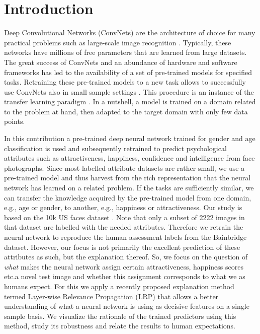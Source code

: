 \documentclass[runningheads]{llncs}
\begin{document}
\section{Introduction}
Deep Convolutional Networks (ConvNets) \cite{le1990handwritten} are the architecture of choice for many practical problems such as large-scale image recognition \cite{krizhevsky2012imagenet,he2015deep}. Typically, these networks have millions of free parameters that are learned from large datasets. The great success of ConvNets and an abundance of hardware and software frameworks \cite{jia2014caffe} has led to the availability of a set of pre-trained models for specified tasks. Retraining these pre-trained models to a new task allows to successfully use ConvNets also in small sample settings \cite{yosinski2014transferable,donahue2013decaf}. This procedure is an instance of the transfer learning paradigm \cite{caruana1997multitask}. In a nutshell, a model is trained on a domain related to the problem at hand, then adapted to the target domain with only few data points.

In this contribution a pre-trained deep neural network trained for gender and age classification \cite{levi2015age} is used and subsequently retrained to predict psychological attributes such as attractiveness, happiness, confidence and intelligence from face photographs. Since most labelled attribute datasets are rather small, we use a pre-trained model and thus harvest from the rich representation that the neural network has learned on a related problem. If the tasks are sufficiently similar, we can transfer the knowledge acquired by the pre-trained model from one domain, e.g., age or gender, to another, e.g., happiness or attractiveness.
Our study is based on the 10k US faces dataset \cite{bainbridge2013intrinsic}. Note that only a subset of 2222 images in that dataset are labelled with the needed attributes. Therefore we retrain the neural network \cite{levi2015age} to reproduce the human assessment labels from the Bainbridge dataset. 
However, our focus is not primarily the excellent prediction of these attributes as such, but the explanation thereof. So, we focus on the question of {\it what} makes the neural network assign certain attractiveness, happiness scores etc.\to a novel test image and whether this assignment corresponds to what we as humans expect.
For this we apply a recently proposed explanation method termed Layer-wise Relevance Propagation (LRP) \cite{bach2015pixel} that allows a better understanding of what a neural network is using as decisive features on a single sample basis. We visualize the rationale of the trained predictors using this method, study its robustness and relate the results to human expectations. 
\end{document}
